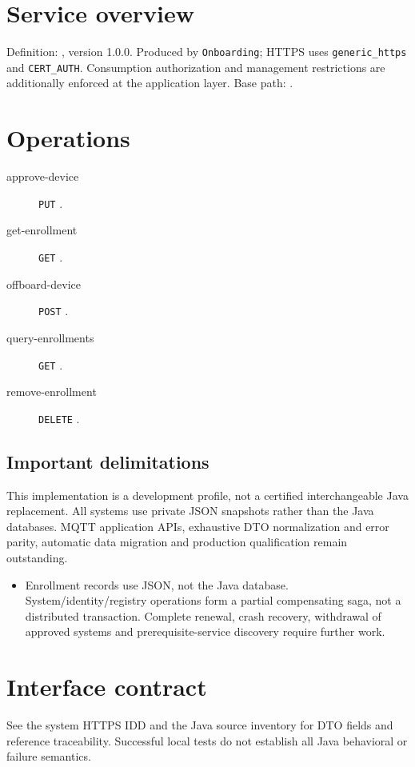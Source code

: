 \documentclass[a4paper]{arrowhead}
\begin{document}
\ArrowheadSetup
\section{Service overview}
Definition: , version 1.0.0. Produced by \texttt{Onboarding}; HTTPS uses \texttt{generic\_https} and \texttt{CERT\_AUTH}. Consumption authorization and management restrictions are additionally enforced at the application layer. Base path: .
\section{Operations}
\begin{description}
\item[approve-device] \texttt{PUT} .
\item[get-enrollment] \texttt{GET} .
\item[offboard-device] \texttt{POST} .
\item[query-enrollments] \texttt{GET} .
\item[remove-enrollment] \texttt{DELETE} .
\end{description}
\subsection{Important delimitations}
This implementation is a development profile, not a certified interchangeable Java replacement. All systems use private JSON snapshots rather than the Java databases. MQTT application APIs, exhaustive DTO normalization and error parity, automatic data migration and production qualification remain outstanding.
\begin{itemize}
\item Enrollment records use JSON, not the Java database. System/identity/registry operations form a partial compensating saga, not a distributed transaction. Complete renewal, crash recovery, withdrawal of approved systems and prerequisite-service discovery require further work.
\end{itemize}
\section{Interface contract}
See the system HTTPS IDD and the Java source inventory for DTO fields and reference traceability. Successful local tests do not establish all Java behavioral or failure semantics.
\end{document}
